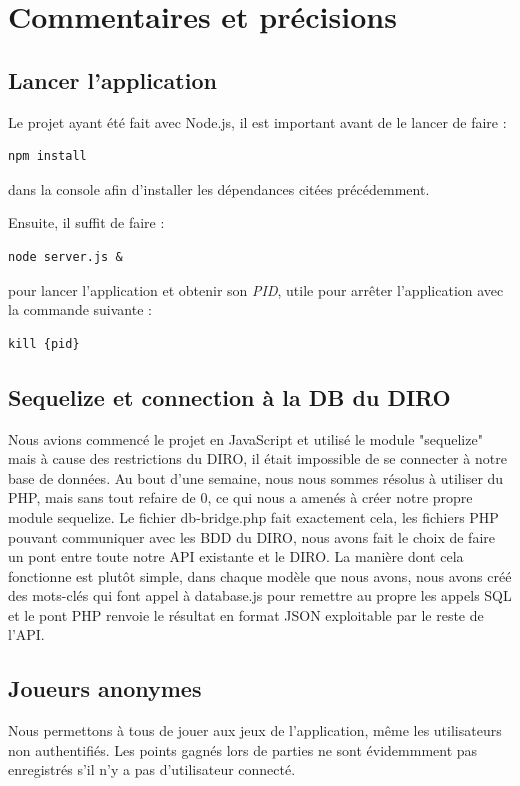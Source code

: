 \documentclass{article}
\begin{document}
\section{Commentaires et précisions}

\subsection{Lancer l'application}
Le projet ayant été fait avec Node.js, il est important avant de le lancer de faire :

\begin{verbatim}
npm install
\end{verbatim}

dans la console afin d'installer les dépendances citées précédemment.

Ensuite, il suffit de faire :

\begin{verbatim}
node server.js &
\end{verbatim}

pour lancer l'application et obtenir son \textit{PID}, utile pour arrêter l'application avec la commande suivante :

\begin{verbatim}
kill {pid}
\end{verbatim}


\subsection{Sequelize et connection à la DB du DIRO}
Nous avions commencé le projet en JavaScript et utilisé le module "sequelize" mais à cause des restrictions du DIRO, il était impossible de se connecter à notre base de données. Au bout d'une semaine, nous nous sommes résolus à utiliser du PHP, mais sans tout refaire de 0, ce qui nous a amenés à créer notre propre module sequelize.
Le fichier db-bridge.php fait exactement cela, les fichiers PHP pouvant communiquer avec les BDD du DIRO, nous avons fait le choix de faire un pont entre toute notre API existante et le DIRO. La manière dont cela fonctionne est plutôt simple, dans chaque modèle que nous avons, nous avons créé des mots-clés qui font appel à database.js pour remettre au propre les appels SQL et le pont PHP renvoie le résultat en format JSON exploitable par le reste de l'API.

\subsection{Joueurs anonymes}
Nous permettons à tous de jouer aux jeux de l'application, même les utilisateurs non authentifiés. Les points gagnés lors de parties ne sont évidemmment pas enregistrés s'il n'y a pas d'utilisateur connecté.
\end{document}
